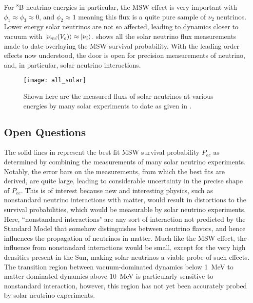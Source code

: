 For $^8$B neutrino energies in particular, the MSW effect is very important with $\phi_1 \approx \phi_3 \approx 0$, and $\phi_2 \approx 1$ meaning this flux is a quite pure sample of $\nu_2$ neutrinos. 
Lower energy solar neutrinos are not so affected, leading to dynamics closer to vacuum with $\ket{\nu_{mi}(V_e)} \approx \ket{\nu_i}$.
 shows all the solar neutrino flux measurements made to date overlaying the MSW survival probability.
With the leading order effects now understood, the door is open for precision measurements of neutrino, and, in particular, solar neutrino interactions.

\begin{figure}
\centering
\texttt{[image: all\_solar]}
\caption{\label{fig:global_solar}Shown here are the measured fluxs of solar neutrinos at various energies by many solar experiments to date as given in \cite{nonstandard_interactions}.}
\end{figure}

\subsection{Open Questions}
The solid lines in  represent the best fit MSW survival probability $P_{ee}$ as determined by combining the measurements of many solar neutrino experiments.
Notably, the error bars on the measurements, from which the best fits are derived, are quite large, leading to considerable uncertainty in the precise shape of $P_{ee}$.
This is of interest because new and interesting physics, such as nonstandard neutrino interactions with matter, would result in distortions to the survival probabilities, which would be measurable by solar neutrino experiments.
Here, ``nonstandard interactions" are any sort of interaction not predicted by the Standard Model that somehow distinguishes between neutrino flavors, and hence influences the propagation of neutrinos in matter.
Much like the MSW effect, the influence from nonstandard interactions would be small, except for the very high densities present in the Sun, making solar neutrinos a viable probe of such effects.
The transition region between vacuum-dominated dynamics below 1~MeV to matter-dominated dynamics above 10~MeV is particularly sensitive to nonstandard interaction, however, this region has not yet been accurately probed by solar neutrino experiments.

